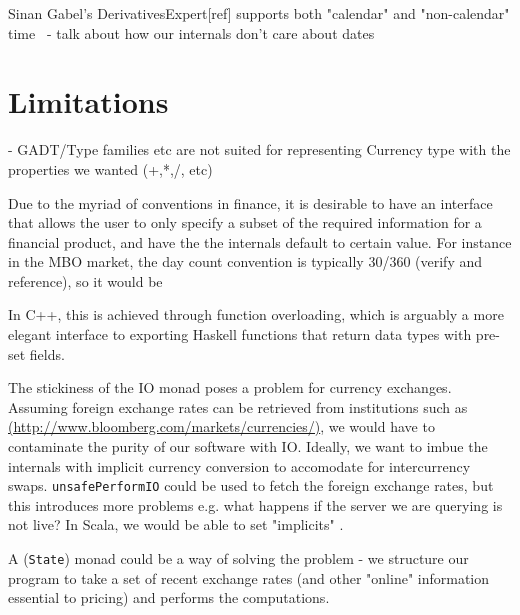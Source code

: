 Sinan Gabel's DerivativesExpert[ref] supports both "calendar" and "non-calendar" time  - talk about how our internals don’t care about dates

\section{Limitations}


    - GADT/Type families etc are not suited for representing Currency type with the properties we wanted (+,*,/, etc)

Due to the myriad of conventions in finance, it is desirable to have an interface that allows the user to only specify a subset of the required information for a financial product, and have the the internals default to certain value. For instance in the MBO market, the day count convention is typically 30/360 (verify and reference), so it would be 

In C++, this is achieved through function overloading, which is arguably a more elegant interface to exporting Haskell functions that return data types with pre-set fields.

The stickiness of the IO monad poses a problem for currency exchanges. Assuming foreign exchange rates can be retrieved from institutions such as \href{Bloomberg}{(http://www.bloomberg.com/markets/currencies/)}, we would have to contaminate the purity of our software with IO. Ideally, we want to imbue the internals with implicit currency conversion to accomodate for intercurrency swaps. \texttt{unsafePerformIO} could be used to fetch the foreign exchange rates, but this introduces more problems e.g. what happens if the server we are querying is not live?
In Scala, we would be able to set "implicits" .

A (\texttt{State}) monad could be a way of solving the problem - we structure our program to take a set of recent exchange rates (and other "online" information essential to pricing) and performs the computations.
